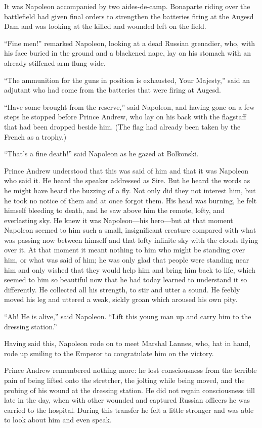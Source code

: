 It was Napoleon accompanied by two aides-de-camp. Bonaparte
riding over the battlefield had given final orders to strengthen
the batteries firing at the Augesd Dam and was looking at the
killed and wounded left on the field.

``Fine men!'' remarked Napoleon, looking at a dead Russian
grenadier, who, with his face buried in the ground and a
blackened nape, lay on his stomach with an already stiffened arm
flung wide.

``The ammunition for the guns in position is exhausted, Your
Majesty,'' said an adjutant who had come from the batteries that
were firing at Augesd.

``Have some brought from the reserve,'' said Napoleon, and having
gone on a few steps he stopped before Prince Andrew, who lay on
his back with the flagstaff that had been dropped beside
him. (The flag had already been taken by the French as a trophy.)

``That's a fine death!'' said Napoleon as he gazed at Bolkonski.

Prince Andrew understood that this was said of him and that it
was Napoleon who said it. He heard the speaker addressed as
Sire. But he heard the words as he might have heard the buzzing
of a fly. Not only did they not interest him, but he took no
notice of them and at once forgot them. His head was burning, he
felt himself bleeding to death, and he saw above him the remote,
lofty, and everlasting sky. He knew it was Napoleon---his
hero---but at that moment Napoleon seemed to him such a small,
insignificant creature compared with what was passing now between
himself and that lofty infinite sky with the clouds flying over
it. At that moment it meant nothing to him who might be standing
over him, or what was said of him; he was only glad that people
were standing near him and only wished that they would help him
and bring him back to life, which seemed to him so beautiful now
that he had today learned to understand it so differently. He
collected all his strength, to stir and utter a sound. He feebly
moved his leg and uttered a weak, sickly groan which aroused his
own pity.

``Ah! He is alive,'' said Napoleon. ``Lift this young man up and
carry him to the dressing station.''

Having said this, Napoleon rode on to meet Marshal Lannes, who,
hat in hand, rode up smiling to the Emperor to congratulate him
on the victory.

Prince Andrew remembered nothing more: he lost consciousness from
the terrible pain of being lifted onto the stretcher, the jolting
while being moved, and the probing of his wound at the dressing
station. He did not regain consciousness till late in the day,
when with other wounded and captured Russian officers he was
carried to the hospital.  During this transfer he felt a little
stronger and was able to look about him and even speak.

